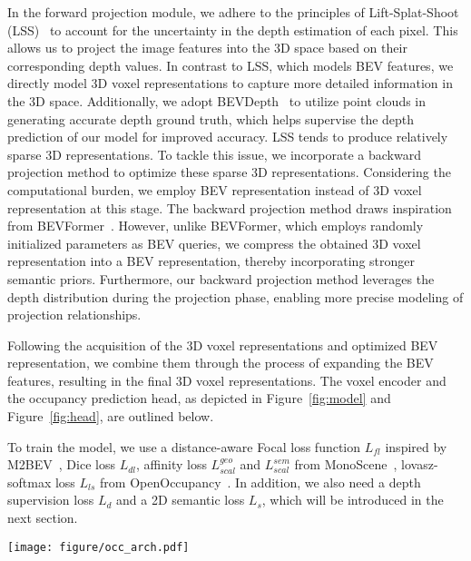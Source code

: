 \documentclass[10pt,twocolumn,letterpaper]{article}
\begin{document}
In the forward projection module, we adhere to the principles of Lift-Splat-Shoot (LSS)~\cite{philion2020lift} to account for the uncertainty in the depth estimation of each pixel. This allows us to project the image features into the 3D space based on their corresponding depth values. In contrast to LSS, which models BEV features, we directly model 3D voxel representations to capture more detailed information in the 3D space. Additionally, we adopt BEVDepth~\cite{li2023bevdepth} to utilize point clouds in generating accurate depth ground truth, which helps supervise the depth prediction of our model for improved accuracy. LSS tends to produce relatively sparse 3D representations. To tackle this issue, we incorporate a backward projection method to optimize these sparse 3D representations. Considering the computational burden, we employ BEV representation instead of 3D voxel representation at this stage. The backward projection method draws inspiration from BEVFormer~\cite{li2022bevformer}. However, unlike BEVFormer, which employs randomly initialized parameters as BEV queries, we compress the obtained 3D voxel representation into a BEV representation, thereby incorporating stronger semantic priors. Furthermore, our backward projection method leverages the depth distribution during the projection phase, enabling more precise modeling of projection relationships.


Following the acquisition of the 3D voxel representations and optimized BEV representation, we combine them through the process of expanding the BEV features, resulting in the final 3D voxel representations. The voxel encoder and the occupancy prediction head, as depicted in Figure~\ref{fig:model} and Figure~\ref{fig:head}, are outlined below.

To train the model, we use a distance-aware Focal loss function $L_{fl}$ inspired by M2BEV~\cite{xie2022m2bev}, Dice loss $L_{dl}$, affinity loss
$L_{scal}^{geo}$ and $L_{scal}^{sem}$ from MonoScene~\cite{cao2022monoscene}, lovasz-softmax loss $L_{ls}$ from OpenOccupancy~\cite{wang2023openoccupancy}. In addition, we also need a depth supervision loss $L_{d}$ and a 2D semantic loss $L_{s}$, which will be introduced in the next section.




\begin{figure*}[htb]
\centering
\texttt{[image: figure/occ\_arch.pdf]}
\vspace{-3mm}
\caption{\textbf{The overall architecture of FB-OCC.} F-VTM is based on forward projection (LSS), and B-VTM is based on backward projection (BEVFormer).
}
\label{fig:model}
\vspace{-3mm}
\end{figure*}
\end{document}
